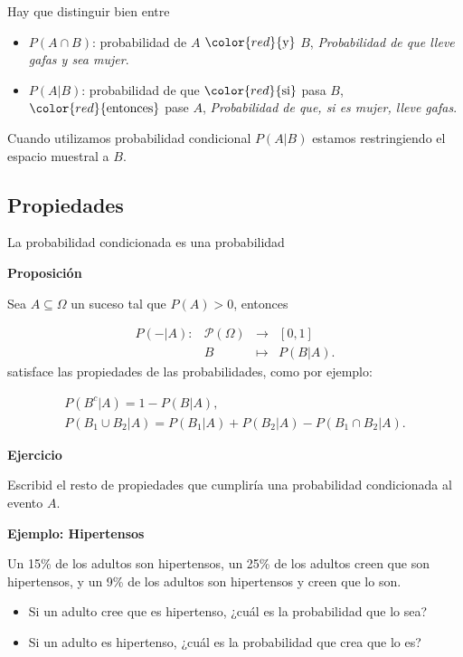 \documentclass[
  letterpaper,
  DIV=11,
  numbers=noendperiod]{scrreprt}
\providecommand{\tightlist}{%
  \setlength{\itemsep}{0pt}\setlength{\parskip}{0pt}}\usepackage{longtable,booktabs,array}
\begin{document}
Hay que distinguir bien entre

\begin{itemize}
\item
  \(P(A\cap B)\): probabilidad de \(A\) \(\color{red}{\text{y}}\) \(B\),
  \emph{Probabilidad de que lleve gafas y sea mujer}.
\item
  \(P(A|B)\): probabilidad de que \(\color{red}{\text{si}}\) pasa \(B\),
  \(\color{red}{\text{entonces}}\) pase \(A\), \emph{Probabilidad de
  que, si es mujer, lleve gafas}.
\end{itemize}

Cuando utilizamos probabilidad condicional \(P(A|B)\) estamos
restringiendo el espacio muestral a \(B\).

\hypertarget{propiedades-2}{%
\subsection{Propiedades}\label{propiedades-2}}

La probabilidad condicionada es una probabilidad

\textbf{Proposición}

Sea \(A\subseteq \Omega\) un suceso tal que \(P(A)>0\), entonces

\[
\begin{array}{rccl}
P(-|A):& \mathcal{P}(\Omega) & \to & [0,1]\\
&B & \mapsto & P(B|A).
\end{array}
\] satisface las propiedades de las probabilidades, como por ejemplo:

\[
\begin{array}{l}
P(B^c|A)=1-P(B|A),\\
P(B_1\cup B_2|A)=P(B_1|A)+P(B_2|A)-P(B_1\cap B_2|A).
\end{array}
\]

\textbf{Ejercicio}

Escribid el resto de propiedades que cumpliría una probabilidad
condicionada al evento \(A\).

\textbf{Ejemplo: Hipertensos}

Un 15\% de los adultos son hipertensos, un 25\% de los adultos creen que
son hipertensos, y un 9\% de los adultos son hipertensos y creen que lo
son.

\begin{itemize}
\tightlist
\item
  Si un adulto cree que es hipertenso, ¿cuál es la probabilidad que lo
  sea?
\item
  Si un adulto es hipertenso, ¿cuál es la probabilidad que crea que lo
  es?
\end{itemize}
\end{document}
